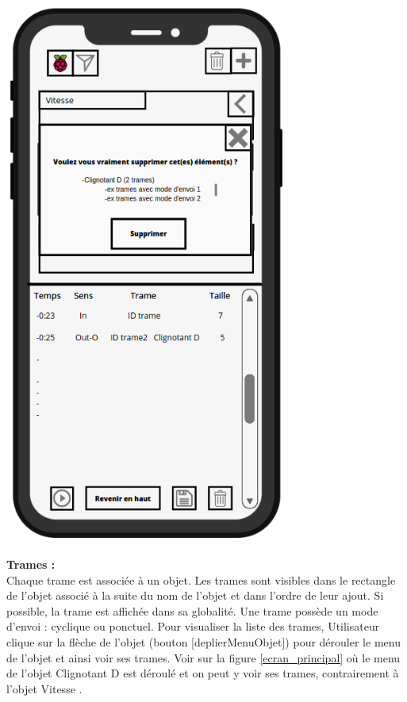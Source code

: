 \begin{minipage}{0.5\linewidth}
    \centering
    \includegraphics[width=0.7\textwidth]{sections/3_Exigences_specifiques/1_IHM/ihm/ecranSuppressionElementObjet.png}
    \captionsetup{justification=centering}
     \label{ecran_popup_suppression_element}
\end{minipage} \newline 

\newpage
\textbf{Trames : } \\

Chaque trame est associée à un objet. Les trames sont visibles dans le rectangle de l'objet associé à la suite du nom de l'objet et dans l'ordre de leur ajout. Si possible, la trame est affichée dans sa globalité. Une trame possède un mode d'envoi : cyclique ou ponctuel. 
Pour visualiser la liste des trames, Utilisateur clique sur la flèche de l'objet (bouton [deplierMenuObjet]) pour dérouler le menu de l'objet et ainsi voir ses trames. Voir sur la figure \ref{ecran_principal} où le menu de l'objet {\guillemetleft} Clignotant D {\guillemetright} est déroulé et on peut y voir ses trames, contrairement à l'objet {\guillemetleft} Vitesse {\guillemetright}. \newline


